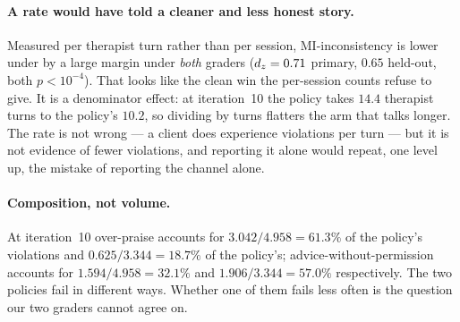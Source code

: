 \paragraph{A rate would have told a cleaner and less honest story.} Measured per therapist turn
rather than per session, MI-inconsistency is lower under \Kf{} by a large margin under
\emph{both} graders ($d_z{}=0.71$ primary, $0.65$ held-out, both $p<10^{-4}$). That looks like the
clean win the per-session counts refuse to give. It is a denominator effect: at iteration~10 the
\Kf{} policy takes $14.4$ therapist turns to the \Kz{} policy's $10.2$, so dividing by turns
flatters the arm that talks longer. The rate is not wrong --- a client does experience violations
per turn --- but it is not evidence of fewer violations, and reporting it alone would repeat, one
level up, the mistake of reporting the channel alone.

\paragraph{Composition, not volume.} At iteration~10 over-praise accounts for
$3.042/4.958 = 61.3\%$ of the \Kz{} policy's violations and $0.625/3.344 = 18.7\%$ of the
\Kf{} policy's; advice-without-permission accounts for $1.594/4.958 = 32.1\%$ and
$1.906/3.344 = 57.0\%$ respectively. The two policies fail in different ways. Whether one of them
fails less often is the question our two graders cannot agree on.
